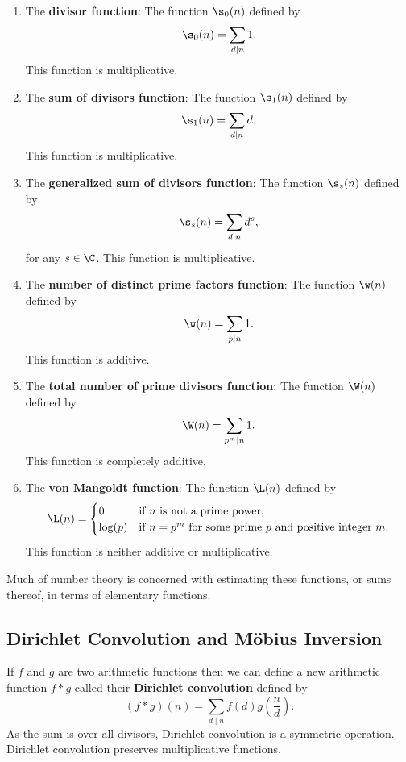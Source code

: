 \documentclass[12pt]{article}
\begin{document}
\begin{enumerate}[label*=(\roman*)]
\[        \]
        This function is multiplicative.
        \item The \textbf{divisor function}: The function \(\s_{0}(n)\) defined by
        \[
          \s_{0}(n) = \sum_{d \mid n}1.
        \]
        This function is multiplicative.
        \item The \textbf{sum of divisors function}: The function \(\s_{1}(n)\) defined by
        \[
          \s_{1}(n) = \sum_{d \mid n}d.
        \]
        This function is multiplicative.
        \item The \textbf{generalized sum of divisors function}: The function \(\s_{s}(n)\) defined by
        \[
          \s_{s}(n) = \sum_{d \mid n}d^{s},
        \]
        for any \(s \in \C\). This function is multiplicative.
        \item The \textbf{number of distinct prime factors function}: The function \(\w(n)\) defined by
        \[
          \w(n) = \sum_{p \mid n}1.
        \]
        This function is additive.
        \item The \textbf{total number of prime divisors function}: The function \(\W(n)\) defined by
        \[
          \W(n) = \sum_{p ^{m} \mid n}1.
        \]
        This function is completely additive.
        \item The \textbf{von Mangoldt function}: The function \(\L(n)\) defined by
        \[
          \L(n) = \begin{cases} 0 & \text{if \(n\) is not a prime power}, \\ \log(p) & \text{if \(n = p^{m}\) for some prime \(p\) and positive integer \(m\)}. \end{cases}
        \]
        This function is neither additive or multiplicative.
      \end{enumerate}
      
      Much of number theory is concerned with estimating these functions, or sums thereof, in terms of elementary functions.
    \subsection{Dirichlet Convolution and M\"obius Inversion}
      If \(f\) and \(g\) are two arithmetic functions then we can define a new arithmetic function \(f \ast g\) called their \textbf{Dirichlet convolution} defined by
      \[
        (f \ast g)(n) = \sum_{d \mid n}f(d)g\left(\frac{n}{d}\right).
      \]
      As the sum is over all divisors, Dirichlet convolution is a symmetric operation. Dirichlet convolution preserves multiplicative functions.
\end{document}
